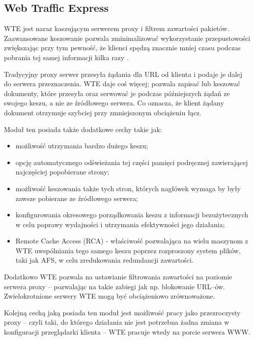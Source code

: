 \subsection{Web Traffic Express}
WTE jest naraz kaszującym serwerem proxy i filtrem zawartości pakietów. Zaawansowane keszowanie pozwala zminimalizować 
wykorzystanie przepustowości zwiększając przy tym pewność, że klienci spędzą znacznie mniej czasu podczas pobrania tej samej 
informacji kilka razy \cite{WTEUsersGuide,WTEProgramming}. 

Tradycyjny proxy serwer przesyła żądania dla URL od klienta i podaje je dalej do serwera przeznaczenia. WTE daje coś więcej; 
pozwala zapisać lub keszować dokumenty, które przesyła oraz serwować je podczas późniejszych żądań ze swojego keszu, a nie ze 
źródłowego serwera. Co oznacza, że klient żądany dokument otrzymuje szybciej przy zmniejszonym obciążeniu łącz. 

Moduł ten posiada także dodatkowe cechy takie jak:
\begin{itemize}
\item możliwość utrzymania bardzo dużego keszu;
\item opcję automatycznego odświeżania tej części pamięci podręcznej zawierającej najczęściej popobierane strony;
\item możliwość keszowania także tych stron, których nagłówek wymaga by były zawsze pobierane ze źródłowego serwera;
\item konfigurowania okresowego porządkowania keszu z informacji bezużytecznych w celu poprawy wydajności i utrzymania 
efektywności jego działania;
\item Remote Cache Access (RCA) - właściwość pozwalająca na wielu maszynom z WTE uwspólniania tego samego keszu poprzez 
rozproszony system plików, taki jak AFS, w celu zredukowania redundancji zawartości.
\end{itemize}

Dodatkowo WTE pozwala na ustawianie filtrowania zawartości na poziomie serwera proxy -- pozwalając na takie zabiegi jak np. 
blokowanie URL--ów. Zwielokrotnione serwery WTE mogą być obciążeniowo zrównoważone.

Kolejną cechą jaką posiada ten moduł jest możliwość pracy jako przezroczysty proxy -- czyli taki, do którego działania nie jest 
potrzebna żadna zmiana w konfiguracji przeglądarki klienta -- WTE pracuje wtedy na porcie serwera WWW. 

